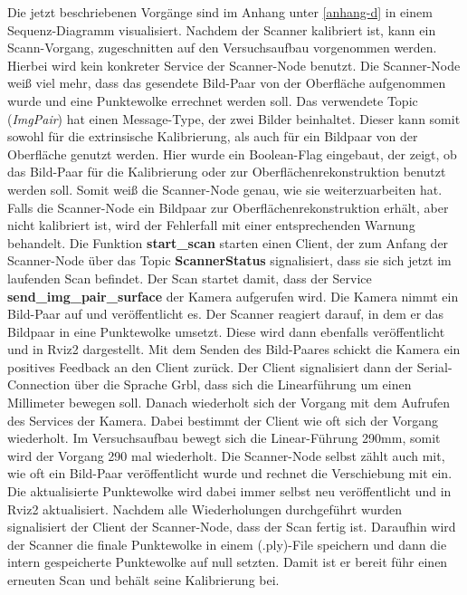 		Die jetzt beschriebenen Vorgänge sind im Anhang unter \ref{anhang-d} in einem Sequenz-Diagramm visualisiert. \newline
		Nachdem der Scanner kalibriert ist, kann ein Scann-Vorgang, zugeschnitten auf den Versuchsaufbau vorgenommen werden. Hierbei wird kein konkreter Service der Scanner-Node benutzt. Die Scanner-Node weiß viel mehr, dass das gesendete Bild-Paar von der Oberfläche aufgenommen wurde und eine Punktewolke errechnet werden soll. Das verwendete Topic (\textit{ImgPair}) hat einen Message-Type, der zwei Bilder beinhaltet. Dieser kann somit sowohl für die extrinsische Kalibrierung, als auch für ein Bildpaar von der Oberfläche genutzt werden. Hier wurde ein Boolean-Flag eingebaut, der zeigt, ob das Bild-Paar für die Kalibrierung oder zur Oberflächenrekonstruktion benutzt werden soll. Somit weiß die Scanner-Node genau, wie sie weiterzuarbeiten hat. Falls die Scanner-Node ein Bildpaar zur Oberflächenrekonstruktion erhält, aber nicht kalibriert ist, wird der Fehlerfall mit einer entsprechenden Warnung behandelt. \newline
		Die Funktion \textbf{start\_scan} starten einen Client, der zum Anfang der Scanner-Node über das Topic \textbf{ScannerStatus} signalisiert, dass sie sich jetzt im laufenden Scan befindet. Der Scan startet damit, dass der Service \textbf{send\_img\_pair\_surface} der Kamera aufgerufen wird. Die Kamera nimmt ein Bild-Paar auf und veröffentlicht es. Der Scanner reagiert darauf, in dem er das Bildpaar in eine Punktewolke umsetzt. Diese wird dann ebenfalls veröffentlicht und in Rviz2 dargestellt. Mit dem Senden des Bild-Paares schickt die Kamera ein positives Feedback an den Client zurück. Der Client signalisiert dann der Serial-Connection über die Sprache Grbl, dass sich die Linearführung um einen Millimeter bewegen soll. Danach wiederholt sich der Vorgang mit dem Aufrufen des Services der Kamera. Dabei bestimmt der Client wie oft sich der Vorgang wiederholt. Im Versuchsaufbau bewegt sich die Linear-Führung 290mm, somit wird der Vorgang 290 mal wiederholt. Die Scanner-Node selbst zählt auch mit, wie oft ein Bild-Paar veröffentlicht wurde und rechnet die Verschiebung mit ein. Die aktualisierte Punktewolke wird dabei immer selbst neu veröffentlicht und in Rviz2 aktualisiert. \newline
		Nachdem alle Wiederholungen durchgeführt wurden signalisiert der Client der Scanner-Node, dass der Scan fertig ist. Daraufhin wird der Scanner die finale Punktewolke in einem (.ply)-File speichern und dann die intern gespeicherte Punktewolke auf null setzten. Damit ist er bereit führ einen erneuten Scan und behält seine Kalibrierung bei.
		
